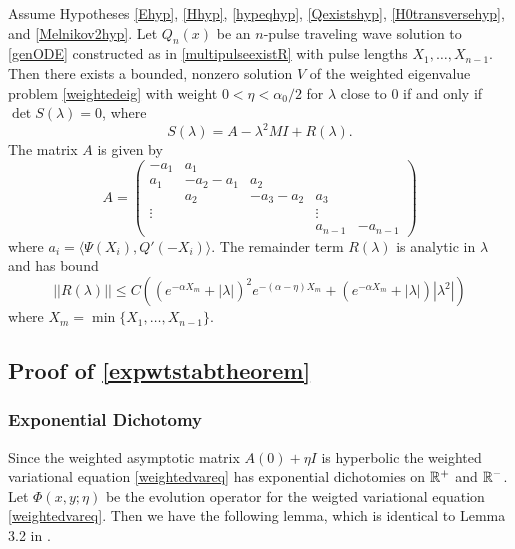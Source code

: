 \documentclass[thesis.tex]{subfiles}
\begin{document}
\begin{theorem}\label{expwtstabtheorem}
Assume Hypotheses \ref{Ehyp}, \ref{Hhyp}, \ref{hypeqhyp}, \ref{Qexistshyp}, \ref{H0transversehyp}, and \ref{Melnikov2hyp}. Let $Q_n(x)$ be an $n$-pulse traveling wave solution to \cref{genODE} constructed as in \ref{multipulseexistR} with pulse lengths $X_1, \dots, X_{n-1}$. Then there exists a bounded, nonzero solution $V$ of the weighted eigenvalue problem \eqref{weightedeig} with weight $0 < \eta < \alpha_0/2$ for $\lambda$ close to 0 if and only if $\det S(\lambda) = 0$, where
\[
S(\lambda) = A - \lambda^2 M I + R(\lambda).
\]
The matrix $A$ is given by
\begin{equation}\label{defA}
A = \begin{pmatrix}
-a_1 & a_1 \\
a_1 & -a_2 - a_1 & a_2 \\
& a_2 & -a_3 - a_2 & a_3 \\
\vdots & & & \vdots \\
& & & a_{n-1} & -a_{n-1} 
\end{pmatrix}
\end{equation}
where $a_i = \langle \Psi(X_i), Q'(-X_i) \rangle$. The remainder term $R(\lambda)$ is analytic in $\lambda$ and has bound
\begin{equation}
||R(\lambda)|| \leq C 
\left( (e^{-\alpha X_m} + |\lambda|)^2 e^{-(\alpha - \eta)X_m}  
+ (e^{-\alpha X_m} + |\lambda| )|\lambda^2| \right)
\end{equation}
where $X_m = \min\{X_1, \dots, X_{n-1}\}$.
\end{theorem}

\subsection{Proof of \cref{expwtstabtheorem}}

\subsubsection{Exponential Dichotomy}

Since the weighted asymptotic matrix $A(0) + \eta I$ is hyperbolic the weighted variational equation \cref{weightedvareq} has exponential dichotomies on $\mathbb{R}^+$ and $\mathbb{R}^-$. Let $\Phi(x, y; \eta)$ be the evolution operator for the weigted variational equation \cref{weightedvareq}. Then we have the following lemma, which is identical to Lemma 3.2 in \cite{Sandstede1998}.
\end{document}
